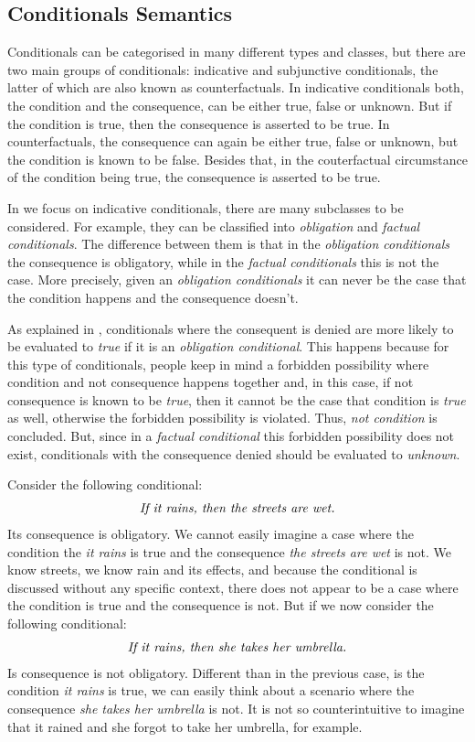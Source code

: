 \subsection{Conditionals Semantics}

Conditionals can be categorised in many different types and classes, but there are two main groups of conditionals: indicative and subjunctive conditionals, the latter of which are also known as counterfactuals. In indicative conditionals both, the condition and the consequence, can be either true, false or unknown. But if the condition is true, then the consequence is asserted to be true. In counterfactuals, the consequence can again be either true, false or unknown, but the condition is known to be false. Besides that, in the couterfactual circumstance of the condition being true, the consequence is asserted to be true.

In we focus on indicative conditionals, there are many subclasses to be considered. For example, they can be classified into \textit{obligation} and \textit{factual conditionals}. The difference between them is that in the \textit{obligation conditionals} the consequence is obligatory, while in the \textit{factual conditionals} this is not  the case. More precisely, given an \textit{obligation conditionals} it can never be the case that the condition happens and the consequence doesn't.

As explained in \cite{byrne2007rational}, conditionals where the consequent is denied are more likely to be evaluated to \textit{true} if it is an \textit{obligation conditional}. This happens because for this type of conditionals, people keep in mind a forbidden possibility where condition and not consequence happens together and, in this case, if not consequence is  known to be \textit{true}, then it cannot be the case that condition is \textit{true} as well, otherwise the forbidden possibility is violated. Thus, \textit{not condition} is concluded.  But, since in a \textit{factual conditional} this forbidden possibility does not exist, conditionals with the consequence denied should be evaluated to \textit{unknown}. 

Consider the following conditional:
\[
\begin{array}{c}
\mbox{\textit{If it rains, then the streets are wet.}}
\end{array}
\]
Its consequence is obligatory. We cannot easily imagine a case where the condition the \textit{it rains} is true and the consequence \textit{the streets are wet} is not. We know streets, we know rain and its effects, and because the conditional is discussed without any specific context, there does not appear to be a case where the condition is true and the consequence is not. But if we now consider the following conditional:
\[
\begin{array}{c}
\mbox{\textit{If it rains, then she takes her umbrella.}}
\end{array}
\]
Is consequence is not obligatory. Different than in the previous case, is the condition \textit{it rains} is true, we can easily think about a scenario where the consequence \textit{she takes her umbrella} is not. It is not so counterintuitive to imagine that it rained and she forgot to take her umbrella, for example.

